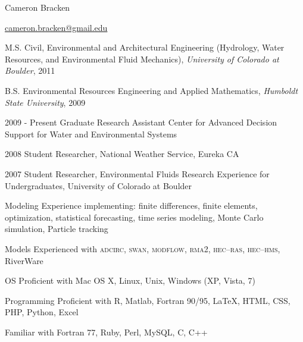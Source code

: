 \documentclass[10pt,a4paper]{scrartcl}
\begin{document}
    \begin{cv}{}
        \begin{cvlist}{}\label{info}  
            \item   Cameron Bracken
            \item   \url{cameron.bracken@gmail.edu}
        \end{cvlist}
        
        \begin{cvlist}{}\label{edu}
            \item[M.S.]   { Civil, Environmental and Architectural Engineering (Hydrology, Water Resources, and Environmental Fluid Mechanics)}, {\it University of Colorado at Boulder}, 2011
            \item[B.S.]   { Environmental Resources Engineering and Applied Mathematics}, {\it Humboldt State University}, 2009
        \end{cvlist}
        
        \begin{cvlist}{}\label{exp}
            {\setlength{\itemsep}{1pt}
            \setlength{\parskip}{0pt}
            \setlength{\parsep}{0pt}
            
            \item[2009 - Present] Graduate Research Assistant Center for Advanced Decision Support for Water and Environmental Systems
            }
            \item[2008] Student Researcher, National Weather Service, Eureka CA
            \item[2007] Student Researcher, Environmental Fluids Research Experience for Undergraduates, University of Colorado at Boulder
        \end{cvlist}
        
        \begin{cvlist}{}\label{skills}
            \item[Modeling] Experience implementing: finite differences, finite elements, optimization, statistical forecasting, time series modeling, Monte Carlo simulation, Particle tracking
            \item[Models] Experienced with \textsc{adcirc}, \textsc{swan}, \textsc{modflow}, \textsc{rma2}, \textsc{hec--ras}, \textsc{hec--hms}, RiverWare
            \item[OS] Proficient with Mac OS X, Linux, Unix, Windows (XP, Vista, 7)
            \item[Programming] Proficient with R, Matlab, Fortran 90/95, \LaTeX, HTML, CSS, PHP, Python, Excel
            \item Familiar with Fortran 77, Ruby, Perl, MySQL, C, C++
        \end{cvlist}
        

\end{cv}
\end{document}
